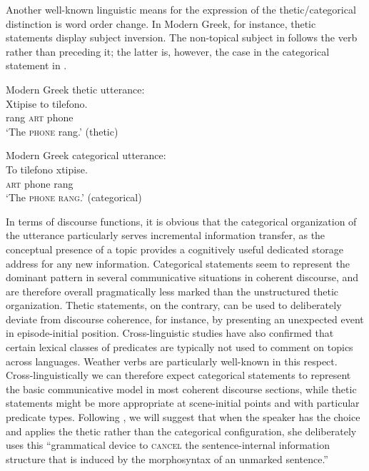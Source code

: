 \documentclass[output=paper]{langsci/langscibook}
\begin{document}
Another well-known linguistic means for the expression of the thetic/categorical distinction is word order change. In Modern Greek, for instance, thetic statements display subject inversion. The non-topical subject in  follows the verb rather than preceding it; the latter is, however, the case in the categorical statement in .

\ea\label{ex:schwarz:3}
{Modern Greek thetic utterance:}\\
\gll Xtipise    to    tilefono. \\
     rang    \textsc{art}    phone\\
\glt ‘The \textsc{phone} rang.’ (thetic)
\z

\ea\label{ex:schwarz:4}
{ Modern Greek   categorical utterance:}\\
\gll To     tilefono   xtipise.\\
     \textsc{art}    phone     rang\\
\glt ‘The \textsc{phone rang}.’ (categorical) \citep[536]{Sasse1987}
\z

In terms of discourse functions, it is obvious that the categorical organization of the utterance particularly serves incremental information transfer, as the conceptual presence of a topic provides a cognitively useful dedicated storage address for any new information. Categorical statements seem to represent the dominant pattern in several communicative situations in coherent discourse, and are therefore overall pragmatically less marked than the unstructured thetic organization. Thetic statements, on the contrary, can be used to deliberately deviate from discourse coherence, for instance, by presenting an unexpected event in episode-initial position. Cross-linguistic studies \citep{Sasse1995} have also confirmed that certain lexical classes of predicates are typically not used to comment on topics across languages. Weather verbs are particularly well-known in this respect. Cross-linguistically we can therefore expect categorical statements to represent the basic communicative model in most coherent discourse sections, while thetic statements might be more appropriate at scene-initial points and with particular predicate types. Following \citet[86]{Güldemann2010}, we will suggest that when the speaker has the choice and applies the thetic rather than the categorical configuration, she deliberately uses this “grammatical device to \textsc{cancel} the sentence-internal information structure that is induced by the morphosyntax of an unmarked sentence.”
\end{document}
